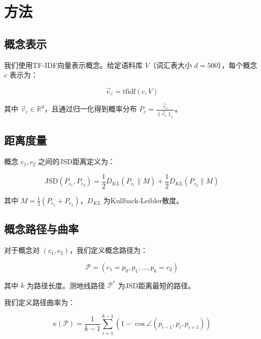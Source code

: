 \documentclass[UTF8,fontset=mac]{ctexart}
\begin{document}
\section{方法}\label{methodology}

\subsection{概念表示}\label{concept-representation}

我们使用TF-IDF向量表示概念。给定语料库 \(V\)（词汇表大小 \(d=500\)），每个概念 \(c\) 表示为：

\begin{equation}
\vec{v}_c = \text{tfidf}(c, V)
\end{equation}

其中 \(\vec{v}_c \in \mathbb{R}^d\)，且通过归一化得到概率分布 \(P_c = \frac{\vec{v}_c}{\|\vec{v}_c\|_1}\)。

\subsection{距离度量}\label{distance-metrics}

概念 \(c_1, c_2\) 之间的JSD距离定义为：

\begin{equation}
\text{JSD}(P_{c_1}, P_{c_2}) = \frac{1}{2} D_{KL}\left(P_{c_1} \parallel M\right) + \frac{1}{2} D_{KL}\left(P_{c_2} \parallel M\right)
\end{equation}

其中 \(M = \frac{1}{2}(P_{c_1} + P_{c_2})\)，\(D_{KL}\) 为Kullback-Leibler散度。

\subsection{概念路径与曲率}\label{concept-paths-curvature}

对于概念对 \((c_1, c_2)\)，我们定义概念路径为：

\begin{equation}
\mathcal{P} = (c_1 = p_0, p_1, \ldots, p_k = c_2)
\end{equation}

其中 \(k\) 为路径长度。测地线路径 \(\mathcal{P}^*\) 为JSD距离最短的路径。

我们定义路径曲率为：

\begin{equation}
\kappa(\mathcal{P}) = \frac{1}{k-1} \sum_{i=1}^{k-1} \left(1 - \cos \angle(p_{i-1}, p_i, p_{i+1})\right)
\end{equation}
\end{document}
